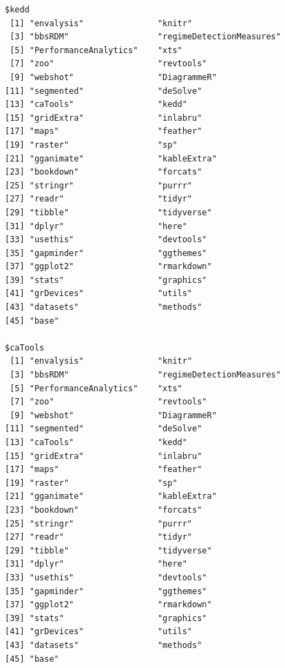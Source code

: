 \documentclass[12pt,twoside,openany]{reedthesis}
\begin{document}
\begin{verbatim}
$kedd
 [1] "envalysis"               "knitr"                  
 [3] "bbsRDM"                  "regimeDetectionMeasures"
 [5] "PerformanceAnalytics"    "xts"                    
 [7] "zoo"                     "revtools"               
 [9] "webshot"                 "DiagrammeR"             
[11] "segmented"               "deSolve"                
[13] "caTools"                 "kedd"                   
[15] "gridExtra"               "inlabru"                
[17] "maps"                    "feather"                
[19] "raster"                  "sp"                     
[21] "gganimate"               "kableExtra"             
[23] "bookdown"                "forcats"                
[25] "stringr"                 "purrr"                  
[27] "readr"                   "tidyr"                  
[29] "tibble"                  "tidyverse"              
[31] "dplyr"                   "here"                   
[33] "usethis"                 "devtools"               
[35] "gapminder"               "ggthemes"               
[37] "ggplot2"                 "rmarkdown"              
[39] "stats"                   "graphics"               
[41] "grDevices"               "utils"                  
[43] "datasets"                "methods"                
[45] "base"                   

$caTools
 [1] "envalysis"               "knitr"                  
 [3] "bbsRDM"                  "regimeDetectionMeasures"
 [5] "PerformanceAnalytics"    "xts"                    
 [7] "zoo"                     "revtools"               
 [9] "webshot"                 "DiagrammeR"             
[11] "segmented"               "deSolve"                
[13] "caTools"                 "kedd"                   
[15] "gridExtra"               "inlabru"                
[17] "maps"                    "feather"                
[19] "raster"                  "sp"                     
[21] "gganimate"               "kableExtra"             
[23] "bookdown"                "forcats"                
[25] "stringr"                 "purrr"                  
[27] "readr"                   "tidyr"                  
[29] "tibble"                  "tidyverse"              
[31] "dplyr"                   "here"                   
[33] "usethis"                 "devtools"               
[35] "gapminder"               "ggthemes"               
[37] "ggplot2"                 "rmarkdown"              
[39] "stats"                   "graphics"               
[41] "grDevices"               "utils"                  
[43] "datasets"                "methods"                
[45] "base"                   


\end{verbatim}
\end{document}
